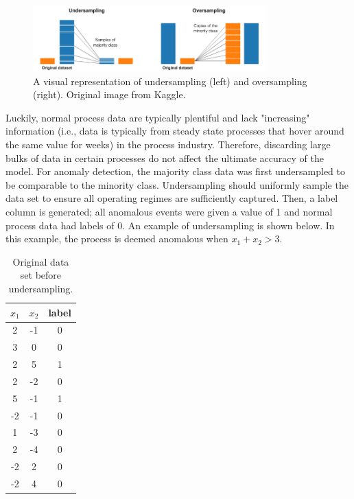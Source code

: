 \begin{figure}[H]
    \centering
    \includegraphics[width=0.8\textwidth]{images/ch3/over_and_undersampling.jpeg}
    \caption{A visual representation of undersampling (left) and oversampling (right). Original image from Kaggle.}
    \label{fig:03under_over_sampling}
\end{figure}

Luckily, normal process data are typically plentiful and lack "increasing" information (i.e., data is typically from steady state processes that hover around the same value for weeks) in the process industry.  Therefore, discarding large bulks of data in certain processes do not affect the ultimate accuracy of the model.  For anomaly detection, the majority class data was first undersampled to be comparable to the minority class. Undersampling should uniformly sample the data set to ensure all operating regimes are sufficiently captured. Then, a label column is generated; all anomalous events were given a value of 1 and normal process data had labels of 0.  An example of undersampling is shown below.  In this example, the process is deemed anomalous when $x_1 + x_2 > 3$.

\begin{table}[H]
    \centering
    \begin{tabular}{ c | c | c }
        $x_1$ & $x_2$ & label \\
        \hline
        2 & -1 & 0 \\
        3 & 0 & 0 \\
        2 & 5 & 1 \\
        2 & -2 & 0 \\
        5 & -1 & 1 \\
        -2 & -1 & 0 \\
        1 & -3 & 0 \\
        2 & -4 & 0 \\
        -2 & 2 & 0 \\
        -2 & 4 & 0 \\
    \end{tabular}
    \caption{Original data set before undersampling.}
    \label{tab:03undersampling}
\end{table}

